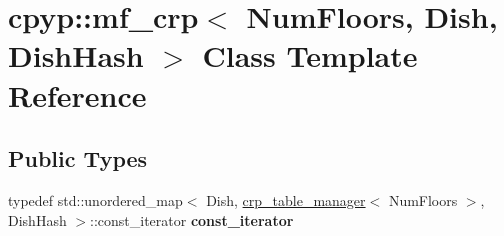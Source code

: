 \hypertarget{classcpyp_1_1mf__crp}{}\section{cpyp\+:\+:mf\+\_\+crp$<$ Num\+Floors, Dish, Dish\+Hash $>$ Class Template Reference}
\label{classcpyp_1_1mf__crp}
\subsection*{Public Types}
\begin{DoxyCompactItemize}
\item 
\mbox{\label{classcpyp_1_1mf__crp_ab9fd602edabc87c4fdec06fe541027cd}} 
typedef std\+::unordered\+\_\+map$<$ Dish, \mbox{\hyperlink{structcpyp_1_1crp__table__manager}{crp\+\_\+table\+\_\+manager}}$<$ Num\+Floors $>$, Dish\+Hash $>$\+::const\+\_\+iterator {\bfseries const\+\_\+iterator}
\end{DoxyCompactItemize}

